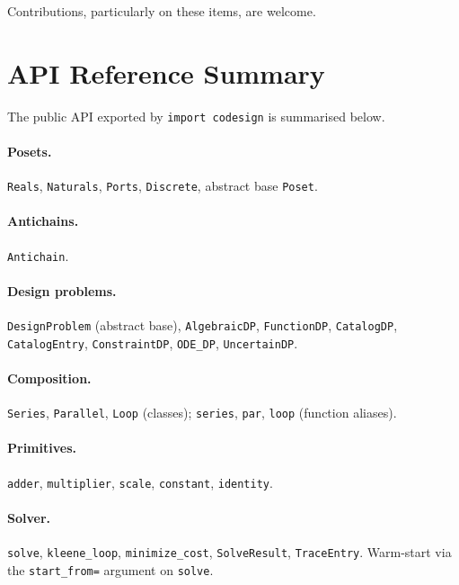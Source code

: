 \documentclass[11pt,a4paper]{article}
\begin{document}
Contributions, particularly on these items, are welcome.

\section{API Reference Summary}
\label{sec:api}

The public API exported by \texttt{import codesign} is summarised
below.

\paragraph{Posets.}
\texttt{Reals}, \texttt{Naturals}, \texttt{Ports},
\texttt{Discrete}, abstract base \texttt{Poset}.

\paragraph{Antichains.}
\texttt{Antichain}.

\paragraph{Design problems.}
\texttt{DesignProblem} (abstract base),
\texttt{AlgebraicDP},
\texttt{FunctionDP},
\texttt{CatalogDP}, \texttt{CatalogEntry},
\texttt{ConstraintDP},
\texttt{ODE\_DP},
\texttt{UncertainDP}.

\paragraph{Composition.}
\texttt{Series}, \texttt{Parallel}, \texttt{Loop} (classes);
\texttt{series}, \texttt{par}, \texttt{loop} (function aliases).

\paragraph{Primitives.}
\texttt{adder}, \texttt{multiplier}, \texttt{scale}, \texttt{constant},
\texttt{identity}.

\paragraph{Solver.}
\texttt{solve}, \texttt{kleene\_loop}, \texttt{minimize\_cost},
\texttt{SolveResult}, \texttt{TraceEntry}. Warm-start via the
\texttt{start\_from=} argument on \texttt{solve}.
\end{document}
